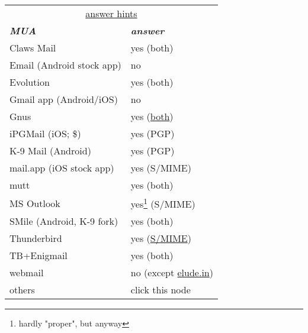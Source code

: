 \documentclass[12pt]{scrartcl}
\begin{document}
\begin{preview}
  \fontsize{4mm}{4mm}\selectfont 
  \begin{minipage}{6cm} %
    \begin{tabular}{lp{26mm}}
      \multicolumn{2}{|c|}{\underline{answer hints}}\\
      \textsl{\textbf{MUA}}          & \textsl{\textbf{answer}}\\
      Claws Mail                     & yes (both)\\
      Email \tiny(Android stock app) & no\\
      Evolution                      & yes (both)\\
      Gmail app \tiny(Android/iOS)   & no\\
      Gnus                           & yes (\href{https://www.emacswiki.org/emacs/GnusSMIME}{both})\\
      iPGMail \tiny(iOS; \$)         & yes (PGP)\\
      K-9 Mail \tiny(Android)        & yes (PGP)\\
      mail.app \tiny(iOS stock app)  & yes (S/MIME)\\
      mutt                           & yes (both)\\
      MS Outlook                     & yes\footnote[$\star$]{hardly "proper", but anyway} (S/MIME)\\
      SMile \tiny(Android, K-9 fork) & yes (both)\\
      Thunderbird                    & yes (\href{http://kb.mozillazine.org/Installing_an_SMIME_certificate}{S/MIME})\\
      TB+Enigmail                    & yes (both)\\
      webmail                        & no \tiny(except \href{eludemaillhqfkh5.onion}{elude.in})\\
      others                         & click this node\\
    \end{tabular}
  \end{minipage}
\end{preview}
\end{document}
